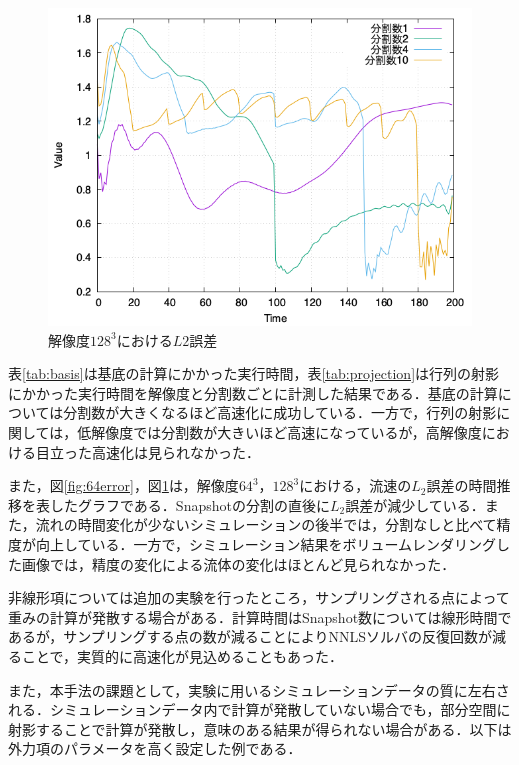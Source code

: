 \documentclass[a4j,12pt]{jreport}
\begin{document}
\begin{figure}[htbp]

\includegraphics[width=140mm]{images/128error.png}
\caption{$解像度128^3におけるL2誤差$}
\label{fig:128error}
\end{figure}
表\ref{tab:basis}は基底の計算にかかった実行時間，表\ref{tab:projection}は行列の射影にかかった実行時間を解像度と分割数ごとに計測した結果である．基底の計算については分割数が大きくなるほど高速化に成功している．一方で，行列の射影に関しては，低解像度では分割数が大きいほど高速になっているが，高解像度における目立った高速化は見られなかった．

また，図\ref{fig:64error}，図\ref{fig:128error}は，解像度$64^3$，$128^3$における，流速の$L_2$誤差の時間推移を表したグラフである．Snapshotの分割の直後に$L_2$誤差が減少している．また，流れの時間変化が少ないシミュレーションの後半では，分割なしと比べて精度が向上している．一方で，シミュレーション結果をボリュームレンダリングした画像では，精度の変化による流体の変化はほとんど見られなかった．

非線形項については追加の実験を行ったところ，サンプリングされる点によって重みの計算が発散する場合がある．計算時間はSnapshot数については線形時間であるが，サンプリングする点の数が減ることによりNNLSソルバの反復回数が減ることで，実質的に高速化が見込めることもあった．

また，本手法の課題として，実験に用いるシミュレーションデータの質に左右される．シミュレーションデータ内で計算が発散していない場合でも，部分空間に射影することで計算が発散し，意味のある結果が得られない場合がある．以下は外力項のパラメータを高く設定した例である．
\end{document}
